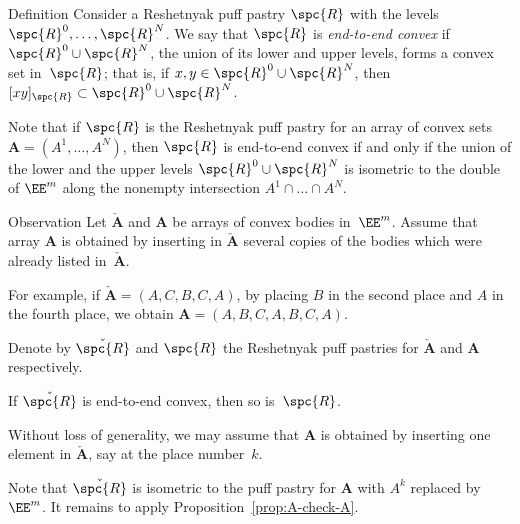 


\begin{thm}{Definition}
Consider a Reshetnyak puff pastry $\spc{R}$ with the levels 
$\spc{R}^0,\dots,\spc{R}^N$.
We say that $\spc{R}$ is \emph{end-to-end convex} 
if $\spc{R}^0\cup\spc{R}^N$, the union of its lower and upper levels, 
forms a convex set in~$\spc{R}$;
that is, if $x,y\in \spc{R}^0\cup\spc{R}^N$, then $[xy]_{\spc{R}}\subset  \spc{R}^0\cup\spc{R}^N$.
\end{thm}

Note that if $\spc{R}$ is the Reshetnyak puff pastry for an array of convex sets $\bm{A}=(A^{1},\dots, A^{N})$, 
then $\spc{R}$ is end-to-end convex
if and only if the union of the lower and the upper levels
$\spc{R}^0\cup\spc{R}^N$ is isometric to the double of $\EE^m$ along the nonempty intersection $A^1\cap\dots\cap A^N$.


\begin{thm}{Observation}\label{obs:end-to-end-convex}
Let $\check{\bm{A}}$ and $\bm{A}$ be arrays of convex bodies in~$\EE^m$.
Assume that array $\bm{A}$ is
obtained by inserting in $\check{\bm{A}}$ 
several copies of the bodies which were already listed in~$\check{\bm{A}}$.

For example, if $\check{\bm{A}}=(A,C,B,C,A)$, by placing $B$ in the second place and $A$ in the fourth place, we obtain $\bm{A}=(A,B,C,A,B,C,A)$.

Denote by $\check{\spc{R}}$ and $\spc{R}$ 
the Reshetnyak puff pastries for $\check{\bm{A}}$ and $\bm{A}$ respectively.

If $\check{\spc{R}}$ is end-to-end convex, then so is~$\spc{R}$.
\end{thm}

Without loss of generality, we may assume that $\bm{A}$ is 
obtained by inserting one element in $\check{\bm{A}}$,
say at the place number~$k$.

Note that $\check{\spc{R}}$ is isometric to the puff pastry 
for $\bm{A}$ with $A^k$ replaced by~$\EE^m$.
It remains to apply Proposition~\ref{prop:A-check-A}.
\qeds

